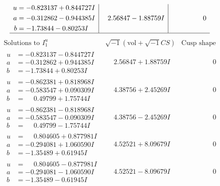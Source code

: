 \documentclass[1p]{elsarticle_modified}
\theoremstyle{definition}
\newcommand{\I}{\sqrt{-1}}
\begin{document}
$$\begin{array}{c|c|c}
\begin{aligned}
u &= -0.823137 + 0.844727 I \\
a &= -0.312862 - 0.944385 I \\
b &= -1.73844 - 0.80253 I\end{aligned}
 & \phantom{-}2.56847 - 1.88759 I & \phantom{-0.000000 } 0\\
 \hline 
 \end{array}$$\newpage$$\begin{array}{c|c|c}  
\text{Solutions to }I^u_{1}& \I (\text{vol} + \sqrt{-1}CS) & \text{Cusp shape}\\
 \hline 
\begin{aligned}
u &= -0.823137 - 0.844727 I \\
a &= -0.312862 + 0.944385 I \\
b &= -1.73844 + 0.80253 I\end{aligned}
 & \phantom{-}2.56847 + 1.88759 I & \phantom{-0.000000 } 0 \\ \hline\begin{aligned}
u &= -0.862381 + 0.818968 I \\
a &= -0.583547 + 0.090309 I \\
b &= \phantom{-}0.49799 + 1.75744 I\end{aligned}
 & \phantom{-}4.38756 + 2.45269 I & \phantom{-0.000000 } 0 \\ \hline\begin{aligned}
u &= -0.862381 - 0.818968 I \\
a &= -0.583547 - 0.090309 I \\
b &= \phantom{-}0.49799 - 1.75744 I\end{aligned}
 & \phantom{-}4.38756 - 2.45269 I & \phantom{-0.000000 } 0 \\ \hline\begin{aligned}
u &= \phantom{-}0.804605 + 0.877981 I \\
a &= -0.294081 + 1.060590 I \\
b &= -1.35489 + 0.61945 I\end{aligned}
 & \phantom{-}4.52521 + 8.09679 I & \phantom{-0.000000 } 0 \\ \hline\begin{aligned}
u &= \phantom{-}0.804605 - 0.877981 I \\
a &= -0.294081 - 1.060590 I \\
b &= -1.35489 - 0.61945 I\end{aligned}
 & \phantom{-}4.52521 - 8.09679 I & \phantom{-0.000000 } 0 \\ \hline\begin{aligned}

\end{aligned}
\end{array}$$
\end{document}
